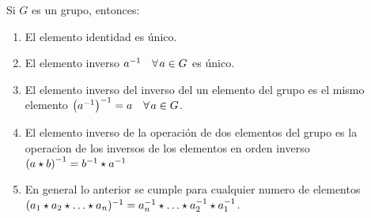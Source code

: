         \begin{proposicion}
            Si $G$ es un grupo, entonces:

            \begin{enumerate}
                \item El elemento identidad es único.
                \item El elemento inverso $a^{-1} \quad \forall \mkern2mu a \in G$ es único.
                \item El elemento inverso del inverso del un elemento del grupo es el mismo elemento $\left( a^{-1} \right)^{-1} = a \quad \forall \mkern2mu a \in G$.
                \item El elemento inverso de la operación de dos elementos del grupo es la operacion de los inversos de los elementos en orden inverso $\left( a \star b \right)^{-1} = b^{-1} \star a^{-1}$
                \item En general lo anterior se cumple para cualquier numero de elementos $(a_1 \op a_2 \op \dots \op a_n)^{-1} = a_n^{-1} \op \dots \op a_2^{-1} \op a_1^{-1}$.
            \end{enumerate}
        \end{proposicion}

